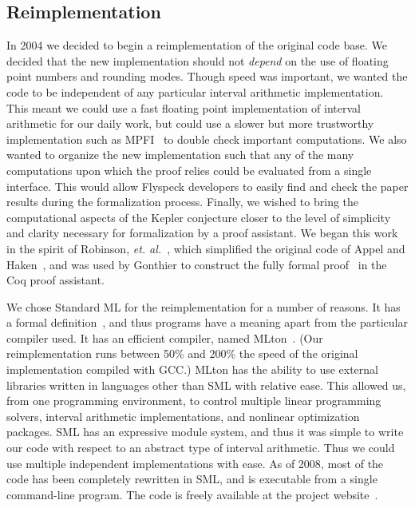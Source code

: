 \documentclass[11pt]{amsart}
\begin{document}

\subsection*{Reimplementation}
\label{sec:sean}

In 2004 we decided to begin a reimplementation of the original code
base.  We decided that the new implementation should not \emph{depend}
on the use of floating point numbers and rounding modes.  Though speed
was important, we wanted the code to be independent of any particular
interval arithmetic implementation.  This meant we could use a fast
floating point implementation of interval arithmetic for our daily
work, but could use a slower but more trustworthy implementation such
as MPFI~\cite{Revol:2005:MPFI} to double check important computations.
We also wanted to organize the new implementation such that any of the
many computations upon which the proof relies could be evaluated from
a single interface.  This would allow Flyspeck developers to easily
find and check the paper results during the formalization process.
Finally, we wished to bring the computational aspects of the
Kepler conjecture closer to the level of simplicity and clarity
necessary for formalization by a proof assistant.  We began this work
in the spirit of Robinson, \textit{et.
al.}~\cite{Robertson:1997:JCTB}, which simplified the original code of
Appel and Haken~\cite{Appel:1986:FourColor}, and was used by Gonthier
to construct the fully formal proof~\cite{gonthier:2008:formal} in the
Coq proof assistant.

We chose Standard ML for the reimplementation for a number of reasons.
It has a formal definition~\cite{Milner:1990:SML}, and thus programs
have a meaning apart from the particular compiler used.  It has an
efficient compiler, named MLton~\cite{website:MLton}.  (Our
reimplementation runs between 50\% and 200\% the speed of the original
implementation compiled with GCC.)  MLton has the ability to use
external libraries written in languages other than SML with relative
ease.  This allowed us, from one programming environment, to control multiple linear programming solvers,
interval arithmetic implementations, and nonlinear optimization
packages.
SML has an expressive module system, and thus it was simple to write
our code with respect to an abstract type of interval arithmetic. 
Thus we could use multiple independent implementations
with ease.  As of 2008, most of the code has been completely
rewritten in SML, and is executable
from a single command-line program.  The code is freely available
at the project website~\cite{McLaughlin:2008:KeplerCode}.
\end{document}
